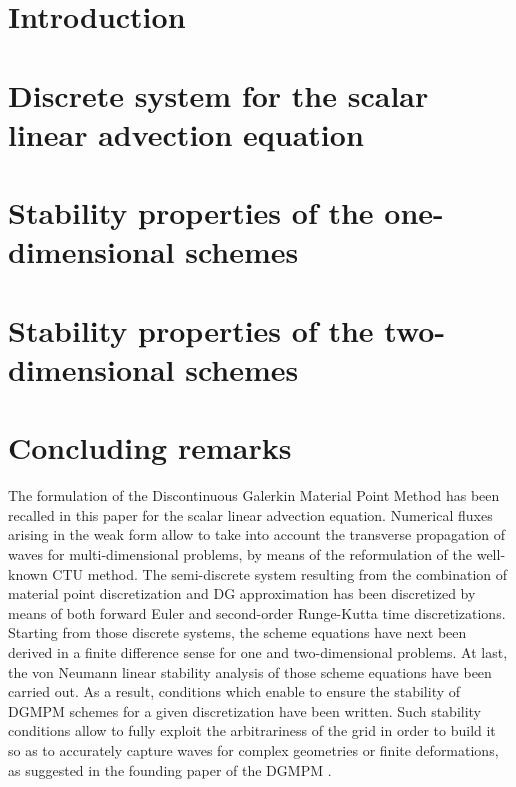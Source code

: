 \documentclass[AMA,STIX1COL]{WileyNJD-v2}
\renewcommand{\(}{\left(}
\renewcommand{\)}{\right)}
\renewcommand{\[}{\left[}
\renewcommand{\]}{\right]}
\begin{document}
\section{Introduction}
\label{sec:introduction}


\section{Discrete system for the scalar linear advection equation}
\label{sec:dgmpm}


\section{Stability properties of the one-dimensional schemes}
\label{sec:1d_stab}


\section{Stability properties of the two-dimensional schemes}
\label{sec:2d_stab}


\section{Concluding remarks}
The formulation of the Discontinuous Galerkin Material Point Method has been recalled in this paper for the scalar linear advection equation.
Numerical fluxes arising in the weak form allow to take into account the transverse propagation of waves for multi-dimensional problems, by means of the reformulation of the well-known CTU method.
The semi-discrete system resulting from the combination of material point discretization and DG approximation has been discretized by means of both forward Euler and second-order Runge-Kutta time discretizations.
Starting from those discrete systems, the scheme equations have next been derived in a finite difference sense for one and two-dimensional problems.
At last, the von Neumann linear stability analysis of those scheme equations have been carried out.
As a result, conditions which enable to ensure the stability of DGMPM schemes for a given discretization have been written.
Such stability conditions allow to fully exploit the arbitrariness of the grid in order to build it so as to accurately capture waves for complex geometries or finite deformations, as suggested in the founding paper of the DGMPM \cite{DGMPM}.
\end{document}
